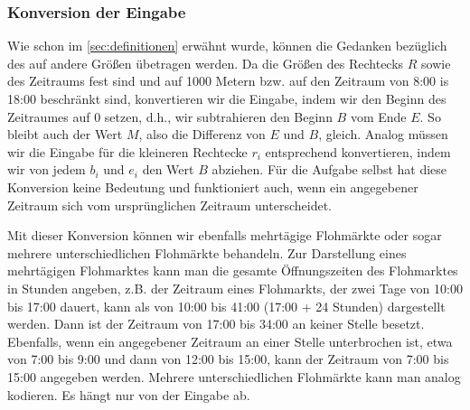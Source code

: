 \subsubsection{Konversion der Eingabe}
Wie schon im \cref{sec:definitionen} erwähnt wurde, können die Gedanken bezüglich des
\fp{} auf andere Größen übetragen werden. Da die Größen des Rechtecks $R$ sowie des Zeitraums fest sind
und auf 1000 Metern bzw. auf den Zeitraum von 8:00 is 18:00 beschränkt sind, konvertieren wir
die Eingabe, indem wir den Beginn des Zeitraumes auf 0 setzen, d.h., wir subtrahieren den 
Beginn $B$ vom Ende $E$. So bleibt auch der Wert $M$, also die Differenz von $E$ und $B$, gleich. 
Analog müssen wir die Eingabe für die kleineren Rechtecke $r_i$ entsprechend konvertieren, indem wir
von jedem $b_i$ und $e_i$ den Wert $B$ abziehen. Für die Aufgabe selbst hat diese Konversion keine
Bedeutung und funktioniert auch, wenn ein angegebener Zeitraum sich vom ursprünglichen Zeitraum unterscheidet.

Mit dieser Konversion können wir ebenfalls mehrtägige Flohmärkte oder
sogar mehrere unterschiedlichen Flohmärkte behandeln.
Zur Darstellung eines mehrtägigen Flohmarktes kann man die gesamte Öffnungszeiten des Flohmarktes in Stunden angeben,
z.B. der Zeitraum eines Flohmarkts, der zwei Tage von 10:00 bis 17:00 dauert,
kann als von 10:00 bis 41:00 (17:00 + 24 Stunden) dargestellt werden. 
Dann ist der Zeitraum von 17:00 bis 34:00 an keiner Stelle besetzt.
Ebenfalls, wenn ein angegebener Zeitraum an einer Stelle unterbrochen ist,
etwa von 7:00 bis 9:00 und dann von 12:00 bis 15:00, kann der
Zeitraum von 7:00 bis 15:00 angegeben werden.
Mehrere unterschiedlichen Flohmärkte kann man analog kodieren. Es hängt nur von der Eingabe ab.
